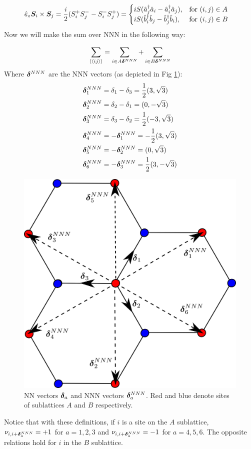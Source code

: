 \begin{equation}
\hat{e}_z \boldsymbol{S}_i \times \boldsymbol{S}_j = \frac{i}{2}(S_i^+S_j^--S_i^-S_j^+) = \begin{cases}
             iS(\hat{a}_j^\dagger\hat{a}_i-\hat{a}_i^\dagger\hat{a}_j),  & \text{for } (i,j) \in A \\
             iS(\hat{b}_i^\dagger\hat{b}_j-\hat{b}_j^\dagger\hat{b}_i),  & \text{for } (i,j) \in B
       \end{cases} \quad
\end{equation}
Now we will make the sum over NNN in the following way:

\begin{equation}
\sum_{\langle \langle i j \rangle \rangle} = \sum_{i\in A \boldsymbol{\delta}^{NNN}} +  \sum_{i\in B \boldsymbol{\delta}^{NNN}}
\end{equation}
Where $\boldsymbol{\delta}^{NNN}$ are the NNN vectors (as depicted in Fig \ref{Fig.Magnon.Vecs}):
\begin{align*}
\boldsymbol{\delta}^{NNN}_1 &= \delta_1-\delta_3 = \frac{1}{2}(3, \sqrt{3}) \\
\boldsymbol{\delta}^{NNN}_2 &= \delta_2-\delta_1 = (0, -\sqrt{3}) \\
\boldsymbol{\delta}^{NNN}_3 &= \delta_3-\delta_2 = \frac{1}{2}(-3, \sqrt{3}) \\
\boldsymbol{\delta}^{NNN}_4 &= -\boldsymbol{\delta}^{NNN}_1 = -\frac{1}{2}(3, \sqrt{3}) \\
\boldsymbol{\delta}^{NNN}_5 &= -\boldsymbol{\delta}^{NNN}_2 = (0, \sqrt{3}) \\
\boldsymbol{\delta}^{NNN}_6 &= -\boldsymbol{\delta}^{NNN}_3 = \frac{1}{2}(3, -\sqrt{3}) \\
\end{align*}
\begin{figure}
\centering
  \includegraphics[width=0.7\linewidth]{../Figures/NNNvec.png}
  \caption{NN vectors $\boldsymbol{\delta}_a$ and NNN vectors $\boldsymbol{\delta}^{NNN}_a$. Red and blue denote sites of sublattices $A$ and $B$ respectively.}
\label{Fig.Magnon.Vecs}
\end{figure}
Notice that with these definitions, if $i$ is a site on the $A$ sublattice, $\nu_{i,i+\boldsymbol{\delta}^{NNN}_a}=+1$ for $a=1,2,3$ and $\nu_{i,i+\boldsymbol{\delta}^{NNN}_a}=-1$ for $a=4,5,6$. The opposite relations hold for $i$ in the $B$ sublattice.

